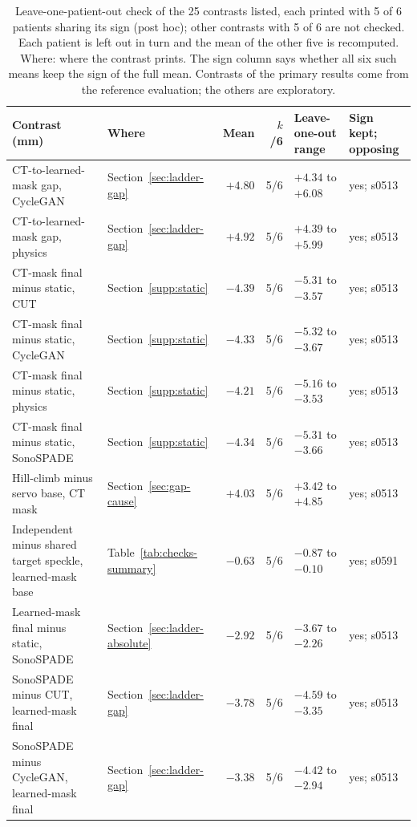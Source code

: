 
\begin{table}[tbp]
\renewcommand{\baselinestretch}{1}\scriptsize
\caption{Leave-one-patient-out check of the 25 contrasts listed, each printed with 5 of 6 patients sharing its sign (post hoc); other contrasts with 5 of 6 are not checked. Each patient is left out in turn and the mean of the other five is recomputed. Where: where the contrast prints. The sign column says whether all six such means keep the sign of the full mean. Contrasts of the primary results come from the reference evaluation; the others are exploratory.}
\label{tab:posthoc-lopo}
\centering
\setlength{\tabcolsep}{3pt}
\begin{tabularx}{\textwidth}{@{}>{\raggedright\arraybackslash}X l r r l l@{}}
\toprule
Contrast (mm) & Where & Mean & $k$/6 & Leave-one-out range & Sign kept; opposing \\
\midrule
CT-to-learned-mask gap, CycleGAN & Section~\ref{sec:ladder-gap} & $+4.80$ & 5/6 & $+4.34$ to $+6.08$ & yes; s0513 \\
CT-to-learned-mask gap, physics & Section~\ref{sec:ladder-gap} & $+4.92$ & 5/6 & $+4.39$ to $+5.99$ & yes; s0513 \\
CT-mask final minus static, CUT & Section~\ref{supp:static} & $-4.39$ & 5/6 & $-5.31$ to $-3.57$ & yes; s0513 \\
CT-mask final minus static, CycleGAN & Section~\ref{supp:static} & $-4.33$ & 5/6 & $-5.32$ to $-3.67$ & yes; s0513 \\
CT-mask final minus static, physics & Section~\ref{supp:static} & $-4.21$ & 5/6 & $-5.16$ to $-3.53$ & yes; s0513 \\
CT-mask final minus static, SonoSPADE & Section~\ref{supp:static} & $-4.34$ & 5/6 & $-5.31$ to $-3.66$ & yes; s0513 \\
Hill-climb minus servo base, CT mask & Section~\ref{sec:gap-cause} & $+4.03$ & 5/6 & $+3.42$ to $+4.85$ & yes; s0513 \\
Independent minus shared target speckle, learned-mask base & Table~\ref{tab:checks-summary} & $-0.63$ & 5/6 & $-0.87$ to $-0.10$ & yes; s0591 \\
Learned-mask final minus static, SonoSPADE & Section~\ref{sec:ladder-absolute} & $-2.92$ & 5/6 & $-3.67$ to $-2.26$ & yes; s0513 \\
SonoSPADE minus CUT, learned-mask final & Section~\ref{sec:ladder-gap} & $-3.78$ & 5/6 & $-4.59$ to $-3.35$ & yes; s0513 \\
SonoSPADE minus CycleGAN, learned-mask final & Section~\ref{sec:ladder-gap} & $-3.38$ & 5/6 & $-4.42$ to $-2.94$ & yes; s0513 \\

\end{tabularx}
\end{table}
